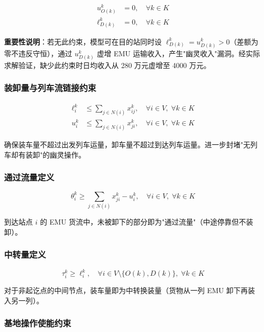 \documentclass[12pt,a4paper,fontset=none]{ctexart}
\begin{document}
\begin{align}
u_{O(k)}^k &= 0, \quad \forall k\in K \label{eq:no_unload_orig} \\
\ell_{D(k)}^k &= 0, \quad \forall k\in K \label{eq:no_load_dest}
\end{align}

\textbf{重要性说明}：若无此约束，模型可在目的站同时设 $\ell_{D(k)}^k = u_{D(k)}^k > 0$（差额为零不违反守恒），通过 $u_{D(k)}^k$ 虚增 EMU 运输收入，产生"幽灵收入"漏洞。经实际求解验证，缺少此约束时日均收入从 280 万元虚增至 4000 万元。

\subsubsection{装卸量与列车流链接约束}

\begin{align}
\ell_i^k &\le \sum_{j\in N(i)} x_{ij}^k, \quad \forall i\in V,\; \forall k\in K \label{eq:load_le_out} \\
u_i^k &\le \sum_{j\in N(i)} x_{ji}^k, \quad \forall i\in V,\; \forall k\in K \label{eq:unload_le_in}
\end{align}

确保装车量不超过出发列车运量，卸车量不超过到达列车运量。进一步封堵"无列车却有装卸"的幽灵操作。

\subsubsection{通过流量定义}

\begin{equation}
\theta_i^k \ge \sum_{j\in N(i)} x_{ji}^k - u_i^k, \quad \forall i\in V,\; \forall k\in K \label{eq:through}
\end{equation}

到达站点 $i$ 的 EMU 货流中，未被卸下的部分即为"通过流量"（中途停靠但不装卸）。

\subsubsection{中转量定义}

\begin{equation}
\tau_i^k \ge \ell_i^k, \quad \forall i\in V\setminus\{O(k), D(k)\},\; \forall k\in K \label{eq:transfer}
\end{equation}

对于非起讫点的中间节点，装车量即为中转换装量（货物从一列 EMU 卸下再装入另一列）。

\subsubsection{基地操作使能约束}
\end{document}
